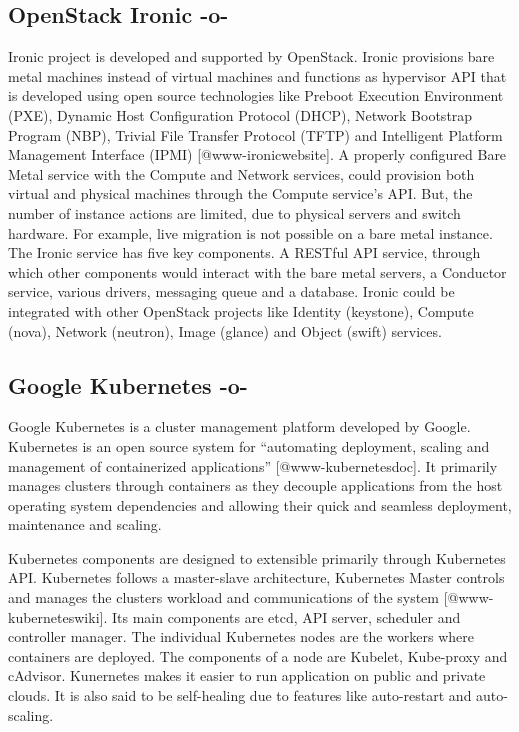 \subsection{OpenStack Ironic -o-}

Ironic project is developed and supported by OpenStack. Ironic
provisions bare metal machines instead of virtual machines and
functions as hypervisor API that is developed using open source
technologies like Preboot Execution Environment (PXE), Dynamic Host
Configuration Protocol (DHCP), Network Bootstrap Program (NBP),
Trivial File Transfer Protocol (TFTP) and Intelligent Platform
Management Interface (IPMI) [@www-ironicwebsite]. A properly
configured Bare Metal service with the Compute and Network services,
could provision both virtual and physical machines through the Compute
service's API. But, the number of instance actions are limited, due to
physical servers and switch hardware. For example, live migration is
not possible on a bare metal instance. The Ironic service has five key
components. A RESTful API service, through which other components
would interact with the bare metal servers, a Conductor service,
various drivers, messaging queue and a database. Ironic could be
integrated with other OpenStack projects like Identity (keystone),
Compute (nova), Network (neutron), Image (glance) and Object (swift)
services.


     
\subsection{Google Kubernetes -o-}

Google Kubernetes is a cluster management platform developed by
Google. Kubernetes is an open source system for ``automating
deployment, scaling and management of containerized
applications'' [@www-kubernetesdoc]. It primarily manages clusters
through containers as they decouple applications from the host
operating system dependencies and allowing their quick and seamless
deployment, maintenance and scaling.

Kubernetes components are designed to extensible primarily through
Kubernetes API. Kubernetes follows a master-slave architecture,
Kubernetes Master controls and manages the clusters workload and
communications of the system [@www-kuberneteswiki].  Its main
components are etcd, API server, scheduler and controller manager. The
individual Kubernetes nodes are the workers where containers are
deployed. The components of a node are Kubelet, Kube-proxy and
cAdvisor. Kunernetes makes it easier to run application on public and
private clouds. It is also said to be self-healing due to features
like auto-restart and auto-scaling.


